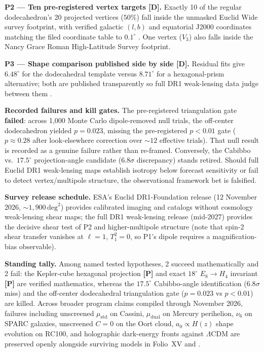 \documentclass[11pt]{article}
\begin{document}
\noindent\textbf{P2 --- Ten pre-registered vertex targets [D].} Exactly 10 of the regular dodecahedron's 20 projected vertices ($50\%$) fall inside the unmasked Euclid Wide survey footprint, with verified galactic $(l,b)$ and equatorial J2000 coordinates matching the filed coordinate table to $0.1^\circ$ \cite{predictions-paper}. One vertex ($V_3$) also falls inside the Nancy Grace Roman High-Latitude Survey footprint.

\noindent\textbf{P3 --- Shape comparison published side by side [D].} Residual fits give $6.48^\circ$ for the dodecahedral template versus $8.71^\circ$ for a hexagonal-prism alternative; both are published transparently so full DR1 weak-lensing data judge between them \cite{predictions-paper}.

\noindent\textbf{Recorded failures and kill gates.} The pre-registered triangulation gate \textbf{failed}: across 1,000 Monte Carlo dipole-removed null trials, the off-center dodecahedron yielded $p = 0.023$, missing the pre-registered $p < 0.01$ gate ($p \approx 0.28$ after look-elsewhere correction over $\sim 12$ effective trials). That null result is recorded as a genuine failure rather than re-framed. Conversely, the Cabibbo vs.\ $17.5^\circ$ projection-angle candidate ($6.8\sigma$ discrepancy) stands retired. Should full Euclid DR1 weak-lensing maps establish isotropy below forecast sensitivity or fail to detect vertex/multipole structure, the observational framework bet is falsified.

\noindent\textbf{Survey release schedule.} ESA's Euclid DR1-Foundation release (12 November 2026, $\sim 1{,}900\,\mathrm{deg}^2$) provides calibrated imaging and catalogs without cosmology weak-lensing shear maps; the full DR1 weak-lensing release (mid-2027) provides the decisive shear test of P2 and higher-multipole structure (note that spin-2 shear transfer vanishes at $\ell=1$, $T_1^2=0$, so P1's dipole requires a magnification-bias observable).

\noindent\textbf{Standing tally.} Among named tested hypotheses, 2 succeed mathematically and 2 fail: the Kepler-cube hexagonal projection \textbf{[P]} and exact $18^\circ$ $E_8 \to H_4$ invariant \textbf{[P]} are verified mathematics, whereas the $17.5^\circ$ Cabibbo-angle identification ($6.8\sigma$ miss) and the off-center dodecahedral triangulation gate ($p=0.023$ vs $p<0.01$) are killed. Across broader program claims compiled through November 2026, failures including unscreened $\mu_{\mathrm{std}}$ on Cassini, $\mu_{\mathrm{dual}}$ on Mercury perihelion, $\nu_6$ on SPARC galaxies, unscreened $C=0$ on the Oort cloud, $a_0 \propto H(z)$ shape evolution on RC100, and holographic dark-energy fronts against $\Lambda$CDM are preserved openly alongside surviving models in Folio~XV and \cite{res-nova-repo}.
\end{document}
